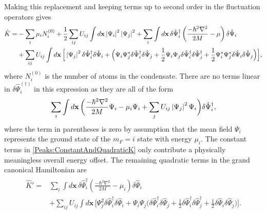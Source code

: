 Making this replacement and keeping terms up to second order in the fluctuation operators gives
\begin{align}
    \begin{split}
        \hat{K} =& -\sum_i \mu_i N_i^{(0)} + \frac{1}{2}\sum_{i j}U_{i j}\int d\mathbf{x} \abs{\Psi_i}^2\abs{\Psi_j}^2 + \sum_i \int d\mathbf{x}\, \delta\hat{\Psi}_i^\dagger \left( \frac{-\hbar^2 \nabla^2}{2M} - \mu\right)\delta\hat{\Psi}_i\\
        &+ \sum_{i j} U_{i j} \int d\mathbf{x}\, \Big[\abs{\Psi_j}^2\delta\hat{\Psi}_i^\dagger \delta\hat{\Psi}_i + \Big(\Psi_i\Psi_j^*\delta\hat{\Psi}_i^\dagger \delta\hat{\Psi}_j + \frac{1}{2} \Psi_i \Psi_j\delta\hat{\Psi}_i^\dagger \delta\hat{\Psi}_j^\dagger + \frac{1}{2} \Psi_i^* \Psi_j^* \delta\hat{\Psi}_i \delta\hat{\Psi}_j \Big)\Big], \label{Peaks:ConstantAndQuadraticK}
    \end{split}
\end{align}
where $N_i^{(0)}$ is the number of atoms in the condensate. There are no terms linear in $\delta\hat{\Psi}_i^{(\dagger)}$ in this expression as they are all of the form
\begin{align}
    \sum_i \int d\mathbf{x}\,  \bigg( \frac{-\hbar^2 \nabla^2}{2M}\Psi_i - \mu_i\Psi_i + \sum_j U_{i j} \left|\Psi_j\right|^2\Psi_i\bigg) \delta \hat{\Psi}_i^\dagger,
\end{align}
where the term in parentheses is zero by assumption that the mean field $\Psi_i$ represents the ground state of the $m_F=i$ state with energy $\mu_i$. The constant terms in \eqref{Peaks:ConstantAndQuadraticK} only contribute a physically meaningless overall energy offset. The remaining quadratic terms in the grand canonical Hamiltonian are
\begin{align}
    \begin{split}
        \hat{K}' =& \sum_i \int d\mathbf{x}\, \delta\hat{\Psi}_i^\dagger \left( \frac{-\hbar^2 \nabla^2}{2M} - \mu_i\right)\delta\hat{\Psi}_i\\
        &+ \sum_{i j} U_{i j} \int d\mathbf{x}\, \Big[\Psi_j^2\delta\hat{\Psi}_i^\dagger \delta\hat{\Psi}_i + \Psi_i\Psi_j\Big(\delta\hat{\Psi}_i^\dagger \delta\hat{\Psi}_j +\frac{1}{2} \delta\hat{\Psi}_i^\dagger \delta\hat{\Psi}_j^\dagger +  \frac{1}{2}\delta\hat{\Psi}_i \delta\hat{\Psi}_j \Big)\Big].
    \end{split}
    \label{Peaks:QuadraticK}
\end{align}

